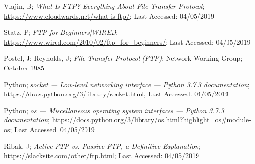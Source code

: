 \documentclass[10pt,twocolumn]{witseiepaper}
\begin{document}
%
\begin{thebibliography}{}


Vlajin, B; \emph{What Is FTP? Everything About File Transfer Protocol}; \url{https://www.cloudwards.net/what-is-ftp/}; Last Accessed: 04/05/2019

Statz, P; \emph{FTP for Beginners|WIRED}; \url{https://www.wired.com/2010/02/ftp_for_beginners/}; Last Accessed: 04/05/2019

Postel, J; Reynolds, J; \emph{File Transfer Protocol (FTP)}; Network Working Group; October 1985

Python; \emph{socket — Low-level networking interface — Python 3.7.3 documentation}; \url{https://docs.python.org/3/library/socket.html}; Last Accessed: 04/05/2019

Python; \emph{os — Miscellaneous operating system interfaces — Python 3.7.3 documentation}; \url{https://docs.python.org/3/library/os.html?highlight=os#module-os}; Last Accessed: 04/05/2019

Ribak, J; \emph{Active FTP vs. Passive FTP, a Definitive Explanation}; \url{https://slacksite.com/other/ftp.html}; Last Accessed: 04/05/2019

\end{thebibliography}
\end{document}
